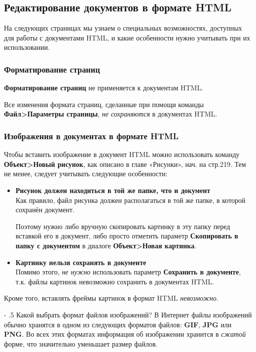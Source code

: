 ﻿\documentclass[a4paper,10pt]{article}
\makeatletter
\renewcommand\paragraph{%
   \@startsection{paragraph}{4}{0mm}%
      {-\baselineskip}%
      {.5\baselineskip}%
      {\normalfont\normalsize\bfseries}}
\makeatother
\begin{document}
\subsection{Редактирование документов в формате HTML}
На следующих страницах мы узнаем о специальных возможностях, доступных для работы с документами HTML, и какие особенности нужно учитывать при их использовании.

\subsubsection{Форматирование страниц}
\textbf{Форматирование страниц} не применяется к документам HTML.

Все изменения формата страниц, сделанные при помощи команды \textbf{Файл>Параметры страницы}, \textit{не сохраняются} в документах HTML.

\subsubsection{Изображения в документах в формате HTML}
Чтобы вставить изображение в документ HTML можно использовать команду \textbf{Объект>Новый рисунок}, как описано в главе «Рисунки», нач. на стр.219. Тем не менее, следует учитывать следующие особенности:
\begin{itemize}
 \item \textbf{Рисунок должен находиться в той же папке, что и документ}\\
 Как правило, файл рисунка должен располагаться в той же папке, в которой сохранён документ.
 
 Поэтому нужно либо вручную скопировать картинку в эту папку перед вставкой его в документ, либо просто отметить параметр \textbf{Скопировать в папку с документом} в диалоге \textbf{Объект>Новая картинка}.
 \item \textbf{Картинку нельзя сохранять в документе}\\
 Помимо этого, \textit{не нужно} использовать параметр \textbf{Сохранить в документе}, т.к. файлы картинок невозможно сохранить в документах HTML.
\end{itemize}

Кроме того, вставлять фреймы картинок в формат HTML \textit{невозможно}.

\paragraph{Какой выбрать формат файлов изображений?}
В Интернет файлы изображений обычно хранятся в одном из следующих форматов файлов: \textbf{GIF}, \textbf{JPG} или \textbf{PNG}. Во всех этих форматах информация об изображении хранится в \textit{сжатой} форме, что значительно уменьшает размер файлов.
\end{document}
